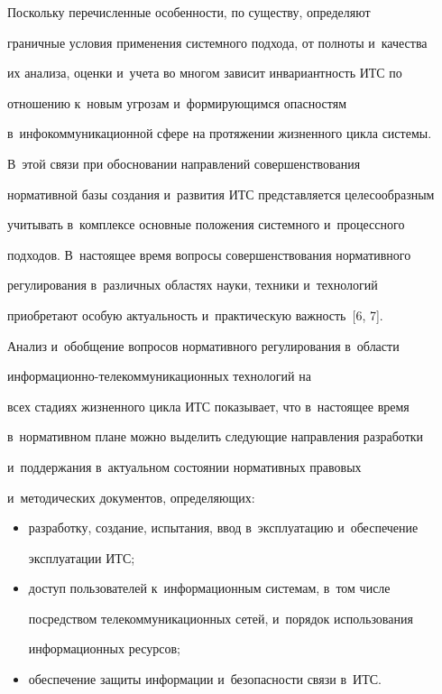      


     Поскольку перечисленные особенности, по существу, определяют 


граничные условия применения системного подхода, от полноты и~качества 


их анализа, оценки и~учета во многом зависит инвариантность ИТС по 


отношению к~новым угрозам и~формирующимся опасностям 


в~инфокоммуникационной сфере на протяжении жизненного цикла системы. 


В~этой связи при обосновании направлений совершенствования 


нормативной базы создания и~развития ИТС представляется целесообразным 


учитывать в~комплексе основные положения системного и~процессного 


подходов. В~настоящее время вопросы совершенствования нормативного 


регулирования в~различных областях науки, техники и~технологий 


приобретают особую актуальность и~практическую важность~[6, 7].


     


     Анализ и~обобщение вопросов нормативного регулирования в~области 


ин\-фор\-ма\-ци\-он\-но-те\-ле\-ком\-му\-ни\-ка\-ци\-он\-ных технологий на 


всех стадиях жизненного цикла ИТС показывает, что в~настоящее время 


в~нормативном плане можно выделить следующие направления разработки 


и~поддержания в~актуальном состоянии нормативных правовых 


и~методических документов, определяющих:


     \begin{itemize}


\item  разработку, создание, испытания, ввод в~эксплуатацию и~обеспечение 


эксплуатации ИТС;


     \item доступ пользователей к~информационным системам, в~том числе 


посредством телекоммуникационных сетей, и~порядок использования 


информационных ресурсов;


     \item обеспечение защиты информации и~безопасности связи в~ИТС.


     \end{itemize}


